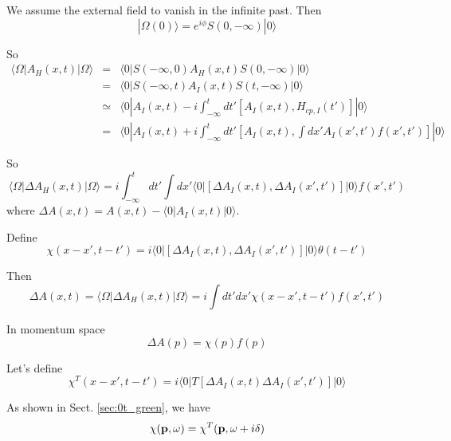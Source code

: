 \documentclass[12pt]{book}
\begin{document}
We assume the external field to vanish in the infinite past. Then
\begin{equation}
	|\Omega(0)\rangle=e^{i\phi}S(0,-\infty)|0\rangle
\end{equation} 

So
\begin{eqnarray}
	\langle \Omega|A_H(x,t)|\Omega\rangle&=&\langle 0|S(-\infty,0)A_H(x,t)S(0,-\infty)|0\rangle\\
	&=&\langle 0|S(-\infty,t)A_I(x,t)S(t,-\infty)|0\rangle\\
	&\simeq&\langle 0|A_I(x,t)-i\int_{-\infty}^tdt'[A_I(x,t),H_{cp,I}(t')]|0\rangle\\
	&=&\langle 0|A_I(x,t)+i\int_{-\infty}^tdt'[A_I(x,t),\int dx'A_I(x',t')f(x',t')]|0\rangle
\end{eqnarray}

So
\begin{equation}
	\langle \Omega|\Delta A_H(x,t)|\Omega\rangle=i\int_{-\infty}^tdt'\int dx'\langle0|[\Delta A_I(x,t),\Delta A_I(x',t')]|0\rangle f(x',t')
\end{equation}
where $\Delta A(x,t)=A(x,t)-\langle 0|A_I(x,t)|0\rangle$.

Define
\begin{equation}
	\chi(x-x',t-t')=i\langle0|[\Delta A_I(x,t),\Delta A_I(x',t')]|0\rangle\theta(t-t')
\end{equation}

Then
\begin{equation}
	\Delta A(x,t)=\langle \Omega|\Delta A_H(x,t)|\Omega\rangle=i\int dt'dx'\chi(x-x',t-t')f(x',t')
\end{equation}

In momentum space
\begin{equation}
	\Delta A(p)=\chi(p)f(p)
\end{equation}

Let's define
\begin{equation}
	\chi^T(x-x',t-t')=i\langle0|T[\Delta A_I(x,t)\Delta A_I(x',t')]|0\rangle
\end{equation}

As shown in Sect. \ref{sec:0t_green}, we have
\begin{equation}
	\chi({\bf p},\omega)=\chi^T({\bf p},\omega+i\delta)
\end{equation}
\end{document}
